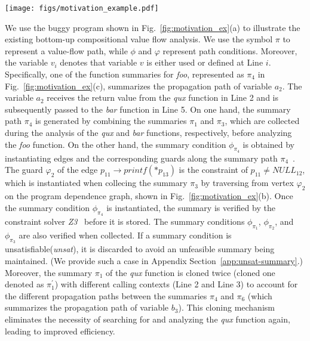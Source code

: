 \begin{figure*}[t]
    \centering
    \texttt{[image: figs/motivation\_example.pdf]}
    \caption{Bottom-up analysis for the code shown in (a).
    The (b) shows the corresponding program dependence graph (PDG). 
    (c) shows the partial function summaries collected during the bottom-up analysis.
    Redundant summaries are highlighted in red.}
    \label{fig:motivation_ex}
\end{figure*}


We use the buggy program shown in Fig.~\ref{fig:motivation_ex}(a) to illustrate the existing bottom-up compositional value flow analysis.
We use the symbol $\pi$ to represent a value-flow path, while $\phi$ and $\varphi$ represent path conditions. Moreover, the variable $v_{i}$ denotes that variable $v$ is either used or defined at Line $i$.
Specifically, one of the function summaries for \textit{foo}, represented as $\pi_{4}$ in Fig.~\ref{fig:motivation_ex}(c), summarizes the propagation path of variable $a_{2}$. 
The variable $a_{2}$ receives the return value from the \textit{qux} function in Line 2 and is subsequently passed to the \textit{bar} function in Line 5.
On one hand, the summary path $\pi_{4}$ is generated by combining the summaries $\pi_{1}$ and $\pi_{3}$, which are collected during the analysis of the \textit{qux} and \textit{bar} functions, respectively, before analyzing the \textit{foo} function.
On the other hand, the summary condition $\phi_{\pi_{4}}$ is obtained by instantiating edges and the corresponding guards along the summary path $\pi_{4}$~\cite{shi2018pinpoint}. 
The guard $\varphi_2$ of the edge $p_{11} \rightarrow printf(*p_{13})$ is the constraint of $p_{11} \neq NULL_{12}$, which is instantiated when collecing the summary $\pi_{3}$ by traversing from vertex $\varphi_2$ on the program dependence graph, shown in Fig.~\ref{fig:motivation_ex}(b).
Once the summary condition $\phi_{\pi_{4}}$ is instantiated, the summary is verified by the constraint solver \textit{Z3}~\cite{de2008z3} before it is stored.
The summary conditions $\phi_{\pi_{1}}$, $\phi_{\pi_{2}}$, and $\phi_{\pi_{3}}$ are also verified when collected.
If a summary condition is unsatisfiable(\textit{unsat}), it is discarded to avoid an unfeasible summary being maintained.
(We provide such a case in Appendix Section~\ref{app:unsat-summary}.)
Moreover, the summary $\pi_1$ of the \textit{qux} function is cloned twice (cloned one denoted as $\pi_1^{\prime}$) with different calling contexts (Line 2 and Line 3) to account for the different propagation paths between the summaries $\pi_4$ and $\pi_6$ (which summarizes the propagation path of variable $b_{3}$). 
This cloning mechanism eliminates the necessity of searching for and analyzing the \textit{qux} function again, leading to improved efficiency.

